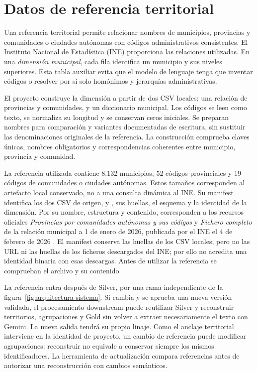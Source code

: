 \section{Datos de referencia territorial}
\label{sec:referencia-ine}
Una referencia territorial permite relacionar nombres de municipios,
provincias y comunidades o ciudades autónomas con códigos administrativos
consistentes. El Instituto Nacional de Estadística (INE) proporciona las
relaciones utilizadas. En una \emph{dimensión municipal}, cada fila identifica
un municipio y sus niveles superiores. Esta tabla auxiliar evita que el
modelo de lenguaje tenga que inventar códigos o resolver por sí solo
homónimos y jerarquías administrativas.

El proyecto construye la dimensión a partir de dos CSV locales: una relación
de provincias y comunidades, y un diccionario municipal. Los códigos
se leen como texto, se normaliza su longitud y se conservan ceros iniciales.
Se preparan nombres para comparación y variantes documentadas de escritura,
sin sustituir las denominaciones originales de la referencia. La construcción
comprueba claves únicas, nombres obligatorios y correspondencias coherentes
entre municipio, provincia y comunidad.

La referencia utilizada contiene 8.132 municipios, 52 códigos provinciales y
19 códigos de comunidades o ciudades autónomas. Estos tamaños corresponden
al artefacto local conservado, no a una consulta dinámica al INE. Su manifest
identifica los dos CSV de origen,  y
, sus huellas, el esquema y la identidad de la
dimensión. Por su nombre, estructura y contenido, corresponden a los recursos
oficiales \emph{Provincias por comunidades autónomas y sus códigos} y
\emph{Fichero completo} de la relación municipal a 1 de enero de 2026,
publicada por el INE el 4 de febrero de 2026
\cite{ine_relacionmunicipios_2026}. El manifest conserva las huellas de los CSV
locales, pero no las URL ni las huellas de los ficheros descargados del INE;
por ello no acredita una identidad binaria con esas descargas. Antes de
utilizar la referencia se comprueban el archivo y su contenido.

La referencia entra después de Silver, por una rama independiente de la
figura~\ref{fig:arquitectura-sistema}. Si cambia y se aprueba una nueva versión
validada, el procesamiento downstream puede reutilizar Silver y reconstruir
territorios, agrupaciones y Gold sin volver a extraer necesariamente el texto
con Gemini. La nueva salida tendrá su propio linaje. Como el anclaje
territorial interviene en la identidad de proyecto, un cambio de referencia
puede modificar agrupaciones: reconstruir no equivale a conservar siempre los
mismos identificadores. La herramienta de actualización compara referencias
antes de autorizar una reconstrucción con cambios semánticos.

